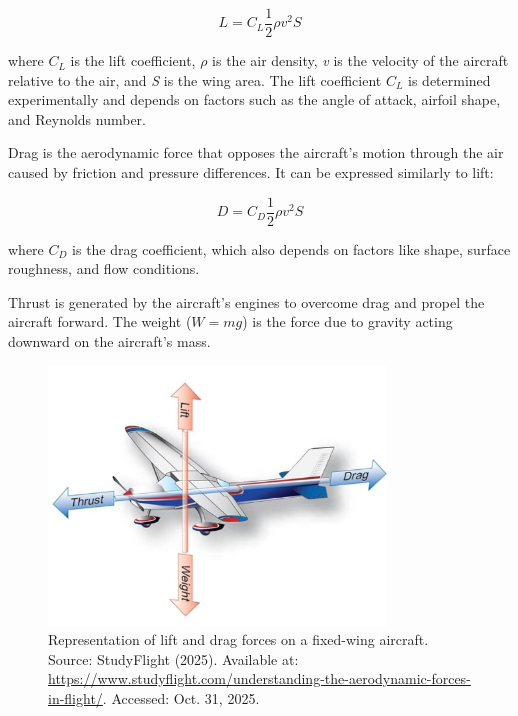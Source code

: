 \begin{equation}
    L = C_L \frac{1}{2} \rho v^2 S
\end{equation}

where $C_L$ is the lift coefficient, \textit{$\rho$} is the air density, \textit{v} is the velocity of the aircraft relative to the air, and \textit{S} is the wing area. The lift coefficient $C_L$ is determined experimentally and depends on factors such as the angle of attack, airfoil shape, and Reynolds number.

Drag is the aerodynamic force that opposes the aircraft's motion through the air caused by friction and pressure differences. It can be expressed similarly to lift:

\begin{equation}
    D = C_D \frac{1}{2} \rho v^2 S
\end{equation}

where $C_D$ is the drag coefficient, which also depends on factors like shape, surface roughness, and flow conditions.

Thrust is generated by the aircraft's engines to overcome drag and propel the aircraft forward. The weight ($W = mg$) is the force due to gravity acting downward on the aircraft's mass.

\begin{figure}[H]
    \centering
    \includegraphics[width=0.8\textwidth]{figures/forces.jpg}
    \caption{Representation of lift and drag forces on a fixed-wing aircraft. \\ Source: StudyFlight (2025). Available at: \url{https://www.studyflight.com/understanding-the-aerodynamic-forces-in-flight/}. Accessed: Oct. 31, 2025.}
\end{figure}


